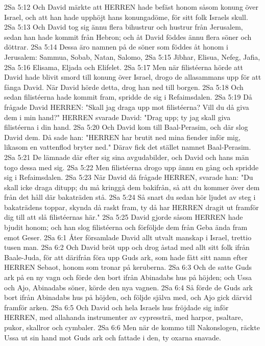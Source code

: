 2Sa 5:12  Och David märkte att HERREN hade befäst honom såsom konung över Israel, och att han hade upphöjt hans konungadöme, för sitt folk Israels skull.
2Sa 5:13  Och David tog sig ännu flera bihustrur och hustrur från Jerusalem, sedan han hade kommit från Hebron; och åt David föddes ännu flera söner och döttrar.
2Sa 5:14  Dessa äro namnen på de söner som föddes åt honom i Jerusalem: Sammua, Sobab, Natan, Salomo,
2Sa 5:15  Jibhar, Elisua, Nefeg, Jafia,
2Sa 5:16  Elisama, Eljada och Elifelet.
2Sa 5:17  Men när filistéerna hörde att David hade blivit smord till konung över Israel, drogo de allasammans upp för att fånga David. När David hörde detta, drog han ned till borgen.
2Sa 5:18  Och sedan filistéerna hade kommit fram, spridde de sig i Refaimsdalen.
2Sa 5:19  Då frågade David HERREN: "Skall jag draga upp mot filistéerna? Vill du då giva dem i min hand?" HERREN svarade David: "Drag upp; ty jag skall giva filistéerna i din hand.
2Sa 5:20  Och David kom till Baal-Perasim, och där slog David dem. Då sade han: "HERREN har brutit ned mina fiender inför mig, likasom en vattenflod bryter ned." Därav fick det stället namnet Baal-Perasim.
2Sa 5:21  De lämnade där efter sig sina avgudabilder, och David och hans män togo dessa med sig.
2Sa 5:22  Men filistéerna drogo upp ännu en gång och spridde sig i Refaimsdalen.
2Sa 5:23  När David då frågade HERREN, svarade han: "Du skall icke draga ditupp; du må kringgå dem bakifrån, så att du kommer över dem från det håll där bakaträden stå.
2Sa 5:24  Så snart du sedan hör ljudet av steg i bakaträdens toppar, skynda då raskt fram, ty då har HERREN dragit ut framför dig till att slå filistéernas här."
2Sa 5:25  David gjorde såsom HERREN hade bjudit honom; och han slog filistéerna och förföljde dem från Geba ända fram emot Geser.
2Sa 6:1  Åter församlade David allt utvalt manskap i Israel, trettio tusen man.
2Sa 6:2  Och David bröt upp och drog åstad med allt sitt folk ifrån Baale-Juda, för att därifrån föra upp Guds ark, som hade fått sitt namn efter HERREN Sebaot, honom som tronar på keruberna.
2Sa 6:3  Och de satte Guds ark på en ny vagn och förde den bort ifrån Abinadabs hus på höjden; och Ussa och Ajo, Abinadabs söner, körde den nya vagnen.
2Sa 6:4  Så förde de Guds ark bort ifrån Abinadabs hus på höjden, och följde själva med, och Ajo gick därvid framför arken.
2Sa 6:5  Och David och hela Israels hus fröjdade sig inför HERREN, med allahanda instrumenter av cypressträ, med harpor, psaltare, pukor, skallror och cymbaler.
2Sa 6:6  Men när de kommo till Nakonslogen, räckte Ussa ut sin hand mot Guds ark och fattade i den, ty oxarna snavade.

